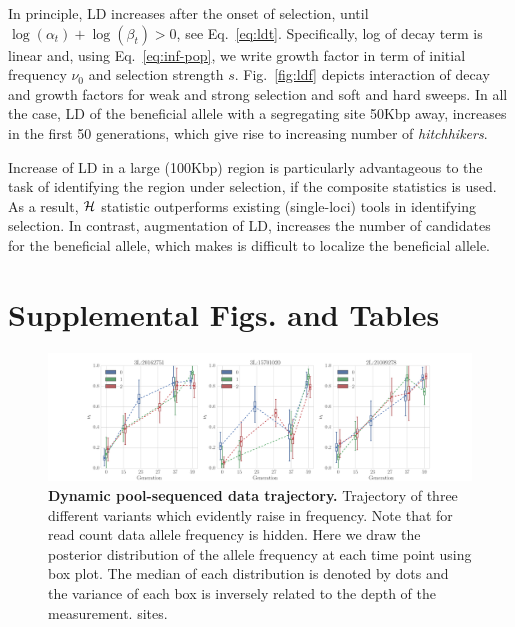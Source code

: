 \documentclass[11pt]{article}
\begin{document}
In principle, LD increases after the onset of selection, until $\log(\alpha_t) 
+\log(\beta_t) 
>0$, see Eq.~\ref{eq:ldt}. 
Specifically, log of decay term is linear and, using 
Eq.~\ref{eq:inf-pop}, we write growth 
factor in term of initial frequency $\nu_0$ and selection strength $s$. 
Fig.~\ref{fig:ldf} depicts interaction of decay and growth factors for weak and 
strong selection and soft and hard sweeps. In all the case, LD of the 
beneficial allele with a segregating site 50Kbp away, increases in the first 50 
generations, which give rise to increasing number of \emph{hitchhikers}. 

Increase of LD in a large (100Kbp) region is particularly advantageous to the 
task of identifying the region under selection, if the composite statistics is 
used. As a result, ${\cal H}$ statistic outperforms existing (single-loci) tools in 
identifying selection. In contrast, augmentation of LD, increases the 
number 
of candidates for 
the beneficial allele, which makes is difficult to localize the beneficial 
allele.

\newpage
\section{Supplemental Figs. and Tables}
\begin{figure}[H]
	\centering
	\includegraphics[width=\textwidth]{figures/trajectoryReal.pdf}
	\caption{{\bf Dynamic pool-sequenced data trajectory.} Trajectory of three 
	different variants which evidently raise in frequency. Note that for read 
	count data allele frequency is hidden. Here we draw the posterior  
	distribution of the allele frequency at each time point using box plot. The 
	median of each distribution is denoted by dots and the variance of each box 
	is inversely related to the depth of the measurement.
	sites.} 
	\label{fig:trajectoryReal}
\end{figure}
\end{document}
